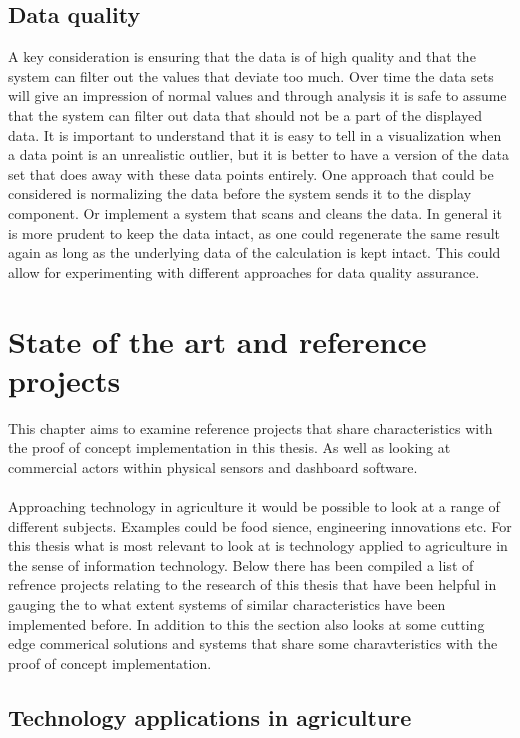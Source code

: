 \documentclass[]{uiophd}
\begin{document}
\section{Data quality}
A key consideration is ensuring that the data is of high quality and that the system can filter out the values that deviate too much. Over time the data sets will give an impression of normal values and through analysis it is safe to assume that the system can filter out data that should not be a part of the displayed data. It is important to understand that it is easy to tell in a visualization when a data point is an unrealistic outlier, but it is better to have a version of the data set that does away with these data points entirely. One approach that could be considered is normalizing the data before the system sends it to the display component. Or implement a system that scans and cleans the data. In general it is more prudent to keep the data intact, as one could regenerate the same result again as long as the underlying data of the calculation is kept intact. This could allow for experimenting with different approaches for data quality assurance.

\chapter{State of the art and reference projects}
This chapter aims to examine reference projects that share characteristics with the proof of concept implementation in this thesis. As well as looking at commercial actors within physical sensors and dashboard software.
\\\\
Approaching technology in agriculture it would be possible to look at a range of different subjects. Examples could be food sience, engineering innovations etc. For this thesis what is most relevant to look at is technology applied to agriculture in the sense of information technology. Below there has been compiled a list of refrence projects relating to the research of this thesis that have been helpful in gauging the to what extent systems of similar characteristics have been implemented before. In addition to this the section also looks at some cutting edge commerical solutions and systems that share some charavteristics with the proof of concept implementation.

\section{Technology applications in agriculture}
\end{document}

